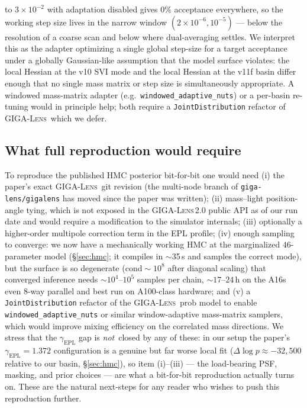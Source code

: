 \documentclass[11pt,letterpaper]{article}
\newcommand{\gammaEPL}{\ensuremath{\gamma_{\mathrm{EPL}}}}
\newcommand{\gigalens}{\textsc{GIGA-Lens}}
\begin{document}
\begin{enumerate}
to $3\times10^{-2}$ with adaptation disabled gives $0\%$ acceptance
everywhere, so the working step size lives in the narrow window
$(2\times10^{-6},10^{-5})$ --- below the resolution of a coarse scan
and below where dual-averaging settles. We interpret this as the
adapter optimizing a single global step-size for a target acceptance
under a globally Gaussian-like assumption that the model surface
violates: the local Hessian at the v10 SVI mode and the local Hessian
at the v11f basin differ enough that no single mass matrix or step
size is simultaneously appropriate. A windowed mass-matrix adapter
(e.g.\ \texttt{windowed\_adaptive\_nuts}) or a per-basin re-tuning
would in principle help; both require a \texttt{JointDistribution}
refactor of \gigalens\ which we defer.
\end{enumerate}

\subsection{What full reproduction would require}

To reproduce the published HMC posterior bit-for-bit one would need
(i) the paper's exact \gigalens\ git revision (the multi-node branch
of \texttt{giga-lens/gigalens} has moved since the paper was written);
(ii) mass--light position-angle tying, which is not exposed in the
\gigalens\,2.0 public API as of our run date and would require a
modification to the simulator internals; (iii) optionally a
higher-order multipole correction term in the EPL profile;
(iv) enough sampling to converge: we now have a mechanically working HMC
at the marginalized $46$-parameter model (\S\ref{sec:hmc}; it compiles in
$\sim$35\,s and samples the correct mode), but the surface is so
degenerate ($\mathrm{cond}\sim10^{8}$ after diagonal scaling) that
converged inference needs $\sim$$10^{4}$--$10^{5}$ samples per chain,
$\sim$$17$--$24$\,h on the A16s even $8$-way parallel and best run on
A100-class hardware; and (v) a \texttt{JointDistribution} refactor of the
\gigalens\ prob model to enable \texttt{windowed\_adaptive\_nuts} or
similar window-adaptive mass-matrix samplers, which would improve mixing
efficiency on the correlated mass directions. We stress that the
$\gammaEPL$ gap is {\it not}\ closed by any of these: in our setup the
paper's $\gammaEPL=1.372$ configuration is a genuine but far worse local
fit ($\Delta\log p\approx-32{,}500$ relative to our basin,
\S\ref{sec:hmc}), so item (i)--(iii) --- the load-bearing PSF, masking,
and prior choices --- are what a bit-for-bit reproduction actually turns
on. These are the natural next-steps for any reader who wishes to push
this reproduction further.
\end{document}
